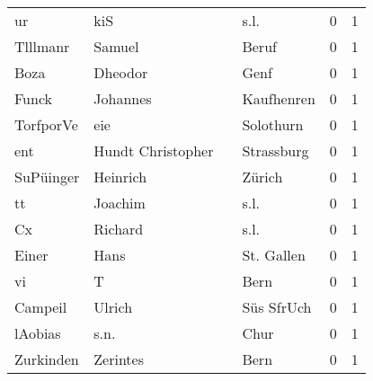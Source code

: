 \begin{center}
\begin{tiny}
\begin{longtabu}{llllrr}
                       ur &                                kiS &             &                                        s.l. &          0 &         1 \\
                 Tlllmanr &                             Samuel &             &                                       Beruf &          0 &         1 \\
                     Boza &                            Dheodor &             &                                        Genf &          0 &         1 \\
                    Funck &                           Johannes &             &                                  Kaufhenren &          0 &         1 \\
                TorfporVe &                                eie &             &                                   Solothurn &          0 &         1 \\
                      ent &                  Hundt Christopher &             &                                  Strassburg &          0 &         1 \\
                SuPüinger &                           Heinrich &             &                                      Zürich &          0 &         1 \\
                       tt &                            Joachim &             &                                        s.l. &          0 &         1 \\
                       Cx &                            Richard &             &                                        s.l. &          0 &         1 \\
                    Einer &                               Hans &             &                                  St. Gallen &          0 &         1 \\
                       vi &                                  T &             &                                        Bern &          0 &         1 \\
                  Campeil &                             Ulrich &             &                                  Süs SfrUch &          0 &         1 \\
                  lAobias &                               s.n. &             &                                        Chur &          0 &         1 \\
                Zurkinden &                           Zerintes &             &                                        Bern &          0 &         1 \\

\end{longtabu}
\end{tiny}
\end{center}
